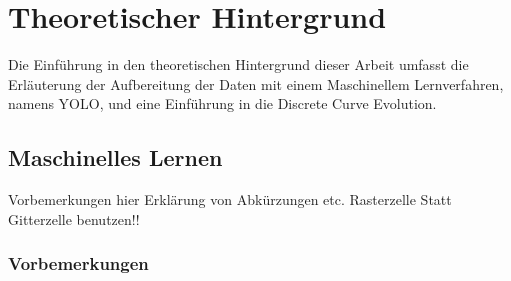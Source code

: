\chapter{Theoretischer Hintergrund}
\label{ch:Theoretischer Hintergrund}
{Die Einführung in den theoretischen Hintergrund dieser Arbeit umfasst die Erläuterung der Aufbereitung der Daten mit einem Maschinellem Lernverfahren, namens YOLO, und eine Einführung in die \glqq Discrete Curve Evolution\grqq{}.
}



\section{Maschinelles Lernen}
{	Vorbemerkungen hier Erklärung von Abkürzungen etc.
Rasterzelle Statt Gitterzelle benutzen!!
	\subsection{Vorbemerkungen}
}
